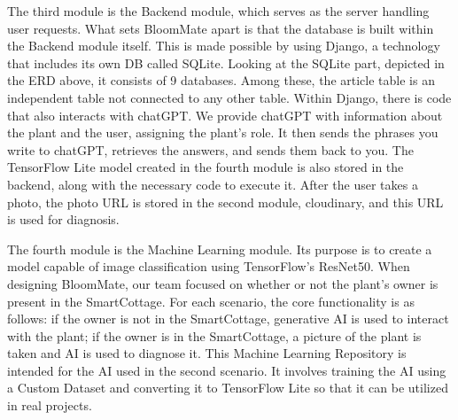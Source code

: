 \documentclass[conference, a4paper]{IEEEtran}
\begin{document}
The third module is the Backend module, which serves as the server handling user requests. What sets BloomMate apart is that the database is built within the Backend module itself. This is made possible by using Django, a technology that includes its own DB called SQLite. Looking at the SQLite part, depicted in the ERD above, it consists of 9 databases. Among these, the article table is an independent table not connected to any other table. Within Django, there is code that also interacts with chatGPT. We provide chatGPT with information about the plant and the user, assigning the plant's role. It then sends the phrases you write to chatGPT, retrieves the answers, and sends them back to you. The TensorFlow Lite model created in the fourth module is also stored in the backend, along with the necessary code to execute it. After the user takes a photo, the photo URL is stored in the second module, cloudinary, and this URL is used for diagnosis.
\newline

The fourth module is the Machine Learning module. Its purpose is to create a model capable of image classification using TensorFlow's ResNet50. When designing BloomMate, our team focused on whether or not the plant's owner is present in the SmartCottage. For each scenario, the core functionality is as follows: if the owner is not in the SmartCottage, generative AI is used to interact with the plant; if the owner is in the SmartCottage, a picture of the plant is taken and AI is used to diagnose it. This Machine Learning Repository is intended for the AI used in the second scenario. It involves training the AI using a Custom Dataset and converting it to TensorFlow Lite so that it can be utilized in real projects.

\newpage
\end{document}
